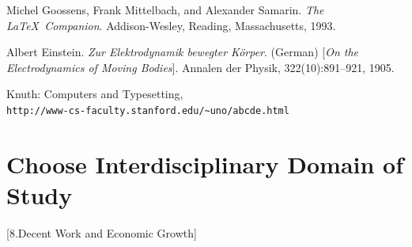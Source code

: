 \documentclass[12pt]{report}
\begin{document}
\begin{thebibliography}{9}
Michel Goossens, Frank Mittelbach, and Alexander Samarin. 
\textit{The \LaTeX\ Companion}. 
Addison-Wesley, Reading, Massachusetts, 1993.
 
Albert Einstein. 
\textit{Zur Elektrodynamik bewegter K{\"o}rper}. (German) 
[\textit{On the Electrodynamics of Moving Bodies}]. 
Annalen der Physik, 322(10):891–921, 1905.
 
Knuth: Computers and Typesetting,
\\\texttt{http://www-cs-faculty.stanford.edu/\~{}uno/abcde.html}
\end{thebibliography}


\section{Choose Interdisciplinary Domain of Study}
[8.Decent Work and Economic Growth]
\end{document}
